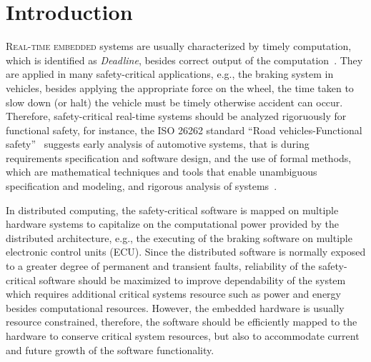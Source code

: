 \chapter{Introduction}\label{chapter_introduction}
\lettrine{R}{eal-time embedded} systems are usually characterized by timely computation, which is identified as  \textit{Deadline}, besides correct output of the computation~\cite{butazzo}. They are applied in many safety-critical applications, e.g., the braking system in vehicles, besides applying the appropriate force on the wheel, the time taken to slow down (or halt) the vehicle must be timely otherwise accident can occur. Therefore, safety-critical real-time systems should be analyzed rigoruously for functional safety, for instance, the ISO 26262 standard ``Road vehicles-Functional safety''~\cite{iso201126262} suggests early analysis of automotive systems, that is during requirements specification and software design, and the use of formal methods, which are mathematical techniques and tools that enable unambiguous specification and modeling, and rigorous analysis of systems~\cite{o2017concise}.

In distributed computing, the safety-critical software is mapped on multiple hardware systems to capitalize on the computational power provided by the distributed architecture, e.g., the executing of the braking software on multiple electronic control units (ECU). Since the distributed software is  normally exposed to a greater degree of permanent and transient faults, reliability of the safety-critical software should be maximized to improve dependability of the  system which requires additional critical systems resource such as power and energy besides computational resources. However, the embedded hardware is usually resource constrained, therefore, the software should be efficiently mapped to the hardware to conserve critical system resources, but also to accommodate current and future growth of the software functionality.

